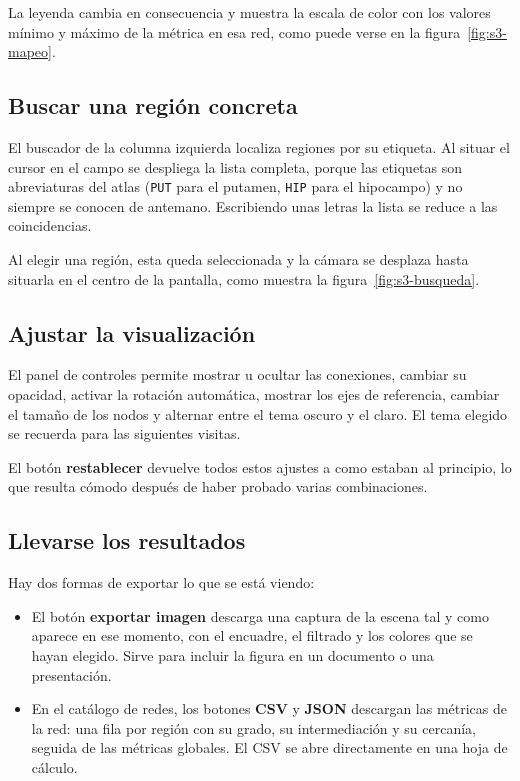 La leyenda cambia en consecuencia y muestra la escala de color con los valores mínimo y máximo de la
métrica en esa red, como puede verse en la figura~\ref{fig:s3-mapeo}.

\subsection{Buscar una región concreta}

El buscador de la columna izquierda localiza regiones por su etiqueta. Al situar el cursor en el
campo se despliega la lista completa, porque las etiquetas son abreviaturas del atlas
(\texttt{PUT} para el putamen, \texttt{HIP} para el hipocampo) y no siempre se conocen de antemano.
Escribiendo unas letras la lista se reduce a las coincidencias.

Al elegir una región, esta queda seleccionada y la cámara se desplaza hasta situarla en el centro de
la pantalla, como muestra la figura~\ref{fig:s3-busqueda}.

\subsection{Ajustar la visualización}

El panel de controles permite mostrar u ocultar las conexiones, cambiar su opacidad, activar la
rotación automática, mostrar los ejes de referencia, cambiar el tamaño de los nodos y alternar entre
el tema oscuro y el claro. El tema elegido se recuerda para las siguientes visitas.

El botón \textbf{restablecer} devuelve todos estos ajustes a como estaban al principio, lo que
resulta cómodo después de haber probado varias combinaciones.

\subsection{Llevarse los resultados}

Hay dos formas de exportar lo que se está viendo:

\begin{itemize}
	\item El botón \textbf{exportar imagen} descarga una captura de la escena tal y como aparece en
		ese momento, con el encuadre, el filtrado y los colores que se hayan elegido. Sirve para
		incluir la figura en un documento o una presentación.
	\item En el catálogo de redes, los botones \textbf{CSV} y \textbf{JSON} descargan las métricas
		de la red: una fila por región con su grado, su intermediación y su cercanía, seguida de las
		métricas globales. El CSV se abre directamente en una hoja de cálculo.
\end{itemize}


